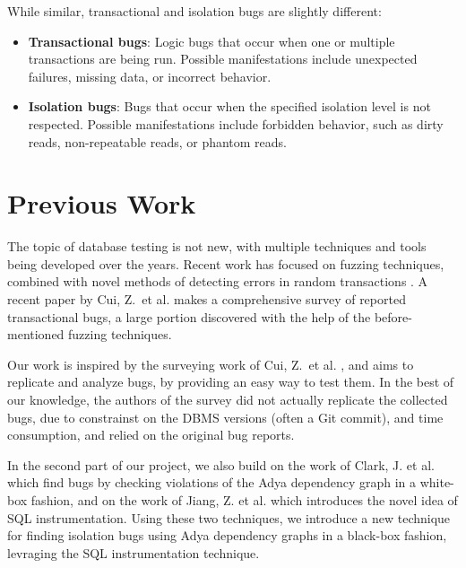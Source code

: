 While similar, transactional and isolation bugs are slightly different:
\begin{itemize}
    \item \textbf{Transactional bugs}: Logic bugs that occur when one or multiple transactions are being run. Possible manifestations include unexpected failures, missing data, or incorrect behavior.
    \item \textbf{Isolation bugs}: Bugs that occur when the specified isolation level is not respected. Possible manifestations include forbidden behavior, such as dirty reads, non-repeatable reads, or phantom reads.
\end{itemize}

\section{Previous Work}

The topic of database testing is not new, with multiple techniques and tools being developed over the years. Recent work has focused on fuzzing techniques, combined with novel methods of detecting errors in random transactions \cite{jiang2023detecting, cui2022differentially_ASE2022, dou2023detecting_ICSE2023, clark2024validating}. A recent paper by Cui, Z.\ et al. \cite{cui2024understanding_ICSE2024} makes a comprehensive survey of reported transactional bugs, a large portion discovered with the help of the before-mentioned fuzzing techniques.

Our work is inspired by the surveying work of Cui, Z.\ et al. \cite{cui2024understanding_ICSE2024}, and aims to replicate and analyze bugs, by providing an easy way to test them. In the best of our knowledge, the authors of the survey did not actually replicate the collected bugs, due to constrainst on the DBMS versions (often a Git commit), and time consumption, and relied on the original bug reports.

In the second part of our project, we also build on the work of Clark, J. et al. \cite{clark2024validating} which find bugs by checking violations of the Adya dependency graph \cite{adya1999weak} in a white-box fashion, and on the work of Jiang, Z. et al. \cite{jiang2023detecting} which introduces the novel idea of SQL instrumentation. Using these two techniques, we introduce a new technique for finding isolation bugs using Adya dependency graphs in a black-box fashion, levraging the SQL instrumentation technique.



